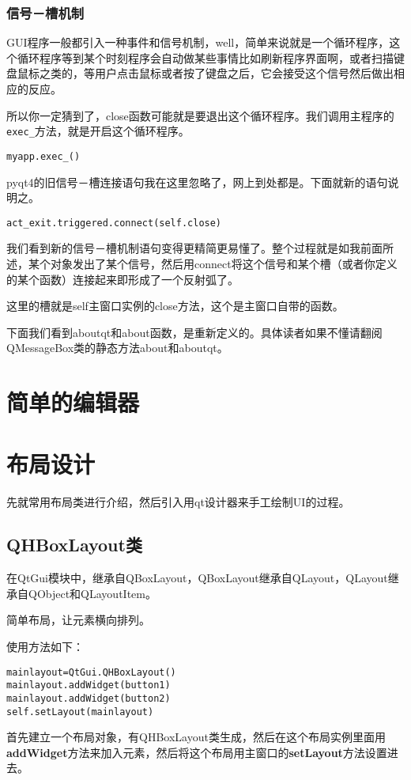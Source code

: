 \documentclass[12pt,oneside]{book}
\begin{document}
\begin{common-format}
\subsection{信号－槽机制}
GUI程序一般都引入一种事件和信号机制，well，简单来说就是一个循环程序，这个循环程序等到某个时刻程序会自动做某些事情比如刷新程序界面啊，或者扫描键盘鼠标之类的，等用户点击鼠标或者按了键盘之后，它会接受这个信号然后做出相应的反应。

所以你一定猜到了，close函数可能就是要退出这个循环程序。我们调用主程序的\verb+exec_+方法，就是开启这个循环程序。
\begin{Verbatim}
myapp.exec_()
\end{Verbatim}

pyqt4的旧信号－槽连接语句我在这里忽略了，网上到处都是。下面就新的语句说明之。
\begin{Verbatim}
act_exit.triggered.connect(self.close)
\end{Verbatim}
我们看到新的信号－槽机制语句变得更精简更易懂了。整个过程就是如我前面所述，某个对象发出了某个信号，然后用connect将这个信号和某个槽（或者你定义的某个函数）连接起来即形成了一个反射弧了。

这里的槽就是self主窗口实例的close方法，这个是主窗口自带的函数。

下面我们看到aboutqt和about函数，是重新定义的。具体读者如果不懂请翻阅QMessageBox类的静态方法about和aboutqt。


\chapter{简单的编辑器}



\chapter{布局设计}
先就常用布局类进行介绍，然后引入用qt设计器来手工绘制UI的过程。

\section{QHBoxLayout类}
在QtGui模块中，继承自QBoxLayout，QBoxLayout继承自QLayout，QLayout继承自QObject和QLayoutItem。

简单布局，让元素横向排列。

使用方法如下：
\begin{Verbatim}
mainlayout=QtGui.QHBoxLayout()
mainlayout.addWidget(button1)
mainlayout.addWidget(button2)
self.setLayout(mainlayout)
\end{Verbatim}
首先建立一个布局对象，有QHBoxLayout类生成，然后在这个布局实例里面用\textbf{addWidget}方法来加入元素，然后将这个布局用主窗口的\textbf{setLayout}方法设置进去。


\end{common-format}
\end{document}
